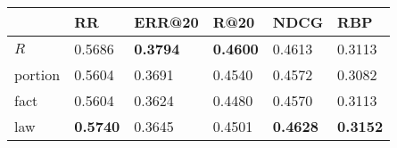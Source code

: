 \begin{tabular}{llllll}
\toprule
{} &               RR &           ERR@20 &             R@20 &             NDCG &              RBP \\
\midrule
$R$     &           0.5686 &  \textbf{0.3794} &  \textbf{0.4600} &           0.4613 &           0.3113 \\
portion &           0.5604 &           0.3691 &           0.4540 &           0.4572 &           0.3082 \\
fact    &           0.5604 &           0.3624 &           0.4480 &           0.4570 &           0.3113 \\
law     &  \textbf{0.5740} &           0.3645 &           0.4501 &  \textbf{0.4628} &  \textbf{0.3152} \\
\bottomrule
\end{tabular}
